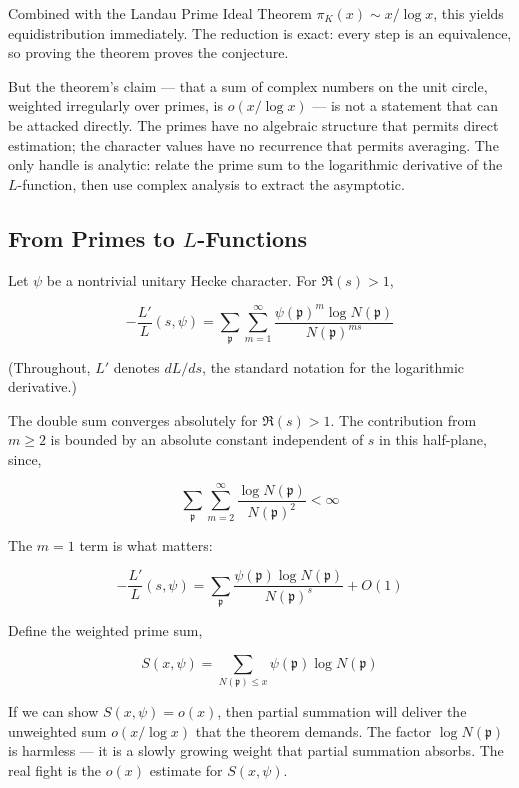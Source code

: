 \documentclass[12pt,a4paper]{article}
\begin{document}
\begin{quote}
\end{quote}

Combined with the Landau Prime Ideal Theorem $\pi_K(x) \sim x/\log x$, this yields equidistribution immediately. The reduction is exact: every step is an equivalence, so proving the theorem proves the conjecture.

But the theorem's claim --- that a sum of complex numbers on the unit circle, weighted irregularly over primes, is $o(x/\log x)$ --- is not a statement that can be attacked directly. The primes have no algebraic structure that permits direct estimation; the character values have no recurrence that permits averaging. The only handle is analytic: relate the prime sum to the logarithmic derivative of the $L$-function, then use complex analysis to extract the asymptotic.

\subsection{From Primes to $L$-Functions}

Let $\psi$ be a nontrivial unitary Hecke character. For $\Re(s) > 1$,

\[
-\frac{L'}{L}(s, \psi) = \sum_{\mathfrak{p}} \sum_{m=1}^\infty \frac{\psi(\mathfrak{p})^m \log N(\mathfrak{p})}{N(\mathfrak{p})^{ms}}
\]

(Throughout, $L'$ denotes $dL/ds$, the standard notation for the logarithmic derivative.)

The double sum converges absolutely for $\Re(s) > 1$. The contribution from $m \geq 2$ is bounded by an absolute constant independent of $s$ in this half-plane, since,

\[
\sum_{\mathfrak{p}} \sum_{m=2}^\infty \frac{\log N(\mathfrak{p})}{N(\mathfrak{p})^{2}} < \infty
\]

The $m=1$ term is what matters:

\[
-\frac{L'}{L}(s, \psi) = \sum_{\mathfrak{p}} \frac{\psi(\mathfrak{p}) \log N(\mathfrak{p})}{N(\mathfrak{p})^{s}} + O(1)
\]

Define the weighted prime sum,

\[
S(x, \psi) = \sum_{N(\mathfrak{p}) \leq x} \psi(\mathfrak{p}) \log N(\mathfrak{p})
\]

If we can show $S(x, \psi) = o(x)$, then partial summation will deliver the unweighted sum $o(x/\log x)$ that the theorem demands. The factor $\log N(\mathfrak{p})$ is harmless --- it is a slowly growing weight that partial summation absorbs. The real fight is the $o(x)$ estimate for $S(x, \psi)$.
\end{document}
